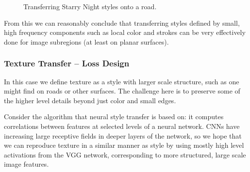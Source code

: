 \documentclass[10pt,twocolumn,letterpaper]{article}
\begin{document}
\begin{figure}[htb]
	\caption{Transferring Starry Night styles onto a road.}
	\label{fig:starry}
\end{figure}

From this we can reasonably conclude that transferring styles defined by small, high frequency components such as local color and strokes can be very effectively done for image subregions (at least on planar surfaces).

\subsubsection{Texture Transfer -- Loss Design}
In this case we define texture as a style with larger scale structure, such as one might find on roads or other surfaces. The challenge here is to preserve some of the higher level details beyond just color and small edges.

Consider the algorithm that neural style transfer is based on: it computes correlations between features at selected levels of a neural network. CNNs have increasing large receptive fields in deeper layers of the network, so we hope that we can reproduce texture in a similar manner as style by using mostly high level activations from the VGG network, corresponding to more structured, large scale image features.
\end{document}
